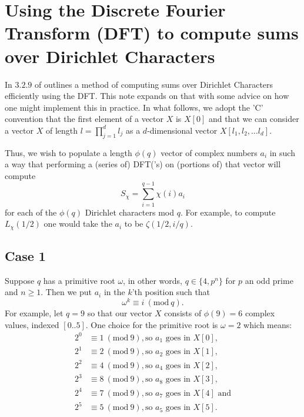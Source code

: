 \documentclass[12pt]{amsart}
\newcommand{\Mod}[1]{\ (\mathrm{mod}\ #1)}
\theoremstyle{remark}
\numberwithin{theorem}{section}
\numberwithin{equation}{section}
\begin{document}
\section{Using the Discrete Fourier Transform (DFT) to compute sums over Dirichlet Characters}

In $3.2.9$ of \cite{Platt2011} outlines a method of computing sums over Dirichlet Characters efficiently using the DFT. This note expands on that with some advice on how one might implement this in practice. In what follows, we adopt the 'C' convention that the first element of a vector $X$ is $X[0]$ and that we can consider a vector $X$ of length $l=\prod_{j=1}^d l_j$ as a $d$-dimensional vector $X[l_1,l_2,\ldots l_d]$.

Thus, we wish to populate a length $\phi(q)$ vector of complex numbers $a_i$ in such a way that performing a (series of) DFT('s) on (portions of) that vector will compute
$$
S_\chi=\sum\limits_{i=1}^{q-1} \chi(i) a_i
$$
for each of the $\phi(q)$ Dirichlet characters mod $q$. For example, to compute $L_\chi(1/2)$ one would take the $a_i$ to be $\zeta(1/2,i/q)$.

\subsection{Case 1}

Suppose $q$ has a primitive root $\omega$, in other words, $q\in\{4,p^n\}$ for $p$ an odd prime and $n\geq 1$. Then we put $a_i$ in the $k$'th position such that
$$
\omega^k \equiv i \Mod{q}.
$$
For example, let $q=9$ so that our vector $X$ consists of $\phi(9)=6$ complex values, indexed $[0..5]$. One choice for the primitive root is $\omega=2$ which means:
\begin{equation*}
  \begin{split}
    2^0 &\equiv 1\Mod{9}, \textrm{so }a_1\textrm{ goes in } X[0],\\
    2^1 &\equiv 2\Mod{9}, \textrm{so }a_2\textrm{ goes in } X[1],\\
    2^2 &\equiv 4\Mod{9}, \textrm{so }a_4\textrm{ goes in } X[2],\\
    2^3 &\equiv 8\Mod{9}, \textrm{so }a_8\textrm{ goes in } X[3],\\
    2^4 &\equiv 7\Mod{9}, \textrm{so }a_7\textrm{ goes in } X[4] \textrm{ and}\\
    2^5 &\equiv 5\Mod{9}, \textrm{so } a_5\textrm{ goes in } X[5].
  \end{split}
\end{equation*}
\end{document}
